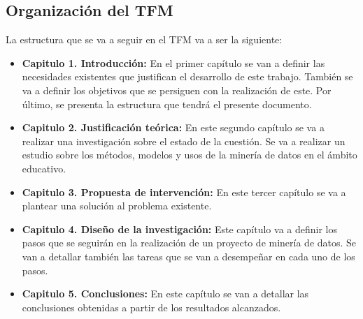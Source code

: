 \subsection{Organización del TFM}
La estructura que se va a seguir en el TFM va a ser la siguiente:
\begin{itemize}
	\item \textbf{Capitulo 1. Introducción:} En el primer capítulo se van a definir las necesidades existentes que justifican el desarrollo de este trabajo. También se va a definir los objetivos que se persiguen con la realización de este. Por último, se presenta la estructura que tendrá el presente documento.
	\item \textbf{Capitulo 2. Justificación teórica:} En este segundo capítulo se va a realizar una investigación sobre el estado de la cuestión. Se va a realizar un estudio sobre los métodos, modelos y usos de la minería de datos en el ámbito educativo. 
	\item \textbf{Capitulo 3. Propuesta de intervención:} En este tercer capítulo se va a plantear una solución al problema existente. 
	\item \textbf{Capitulo 4. Diseño de la investigación:} Este capítulo va a definir los pasos que se seguirán en la realización de un proyecto de minería de datos. Se van a detallar también las tareas que se van a desempeñar en cada uno de los pasos.
	\item \textbf{Capitulo 5. Conclusiones:} En este capítulo se van a detallar las conclusiones obtenidas a partir de los resultados alcanzados.
\end{itemize}





